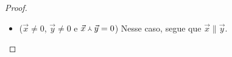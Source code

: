 \begin{proof}
\begin{enumerate}
\begin{itemize}
		\item ($\vec{x} \neq 0$, $\vec{y} \neq 0$ e ${\vec{x}} \Yup {\vec{y}}=0$) Nesse caso, segue que $\vec{x} \parallel \vec{y}$.
		\end{itemize}

\end{enumerate}
\end{proof}

